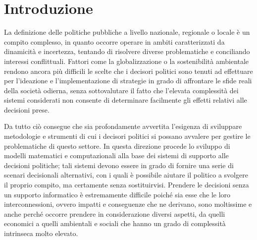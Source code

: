 


%

\clearpage{\pagestyle{empty}\cleardoublepage}
\chapter*{Introduzione} 

La definizione delle politiche pubbliche a livello nazionale, regionale o locale è un compito complesso, in quanto occorre operare in ambiti caratterizzati da dinamicità e incertezza, tentando di risolvere diverse problematiche e conciliando interessi conflittuali. Fattori come la globalizzazione o la sostenibilità ambientale rendono ancora più difficili le scelte che i decisori politici sono tenuti ad effettuare per l'ideazione e l'implementazione di strategie in grado di affrontare le sfide reali della società odierna, senza sottovalutare il fatto che l'elevata complessità dei sistemi considerati non consente di determinare facilmente gli effetti relativi alle decisioni prese.

Da tutto ciò consegue che sia profondamente avvertita l'esigenza di sviluppare metodologie e strumenti di cui i decisori politici si possano avvalere per gestire le problematiche di questo settore. In questa direzione procede lo sviluppo di modelli matematici e computazionali alla base dei sistemi di supporto alle decisioni politiche; tali sistemi devono essere in grado di fornire una serie di scenari decisionali alternativi, con i quali è possibile aiutare il politico a svolgere il proprio compito, ma certamente senza sostituirvisi. Prendere le decisioni senza un supporto informatico è estremamente difficile poiché sia esse che le loro interconnessioni, ovvero impatti e conseguenze che ne derivano, sono moltissime e anche perché occorre prendere in considerazione diversi aspetti, da quelli economici a quelli ambientali e sociali che hanno un grado di complessità intrinseca molto elevato.

